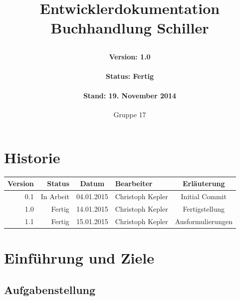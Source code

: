 \documentclass[a4paper]{article}
\author{Gruppe 17}
\date{}
\title{
	\normalfont
	\normalsize 
	\huge{Entwicklerdokumentation Buchhandlung Schiller}
	\horrule{0.5pt}
	\paragraph{Version: 1.0}
	\paragraph{Status: Fertig}
	\paragraph{Stand: 19. November 2014}
	\horrule{2pt}
}
\begin{document}
\maketitle

\newpage
 
\section*{Historie}

\begin{tabular}{|r|r|c|l|c|}
	\hline
	\rowcolor[HTML]{C0C0C0} 
	Version & Status    & Datum      & Bearbeiter       & Erläuterung    	\\ \hline
	0.1     & In Arbeit & 04.01.2015 & Christoph Kepler & Initial Commit 	\\ \hline
	1.0     & Fertig 	& 14.01.2015 & Christoph Kepler & Fertigstellung 	\\ \hline
	1.1     & Fertig 	& 15.01.2015 & Christoph Kepler & Ausformulierungen 	\\ \hline
\end{tabular}

\newpage

\tableofcontents

\newpage

\section{Einführung und Ziele}

\subsection{Aufgabenstellung}
\end{document}
